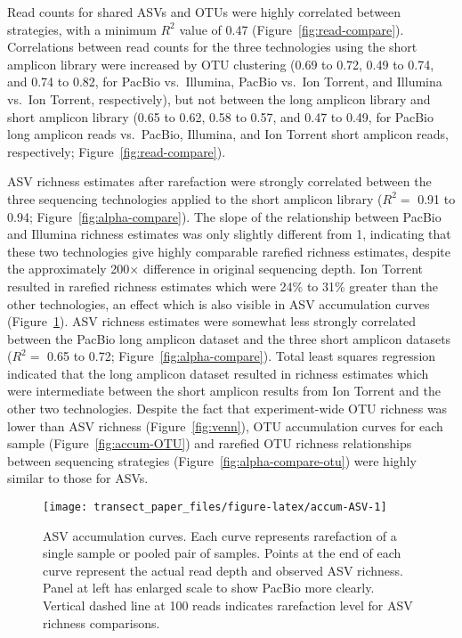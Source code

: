 \documentclass[
  12pt,
]{article}
\begin{document}
Read counts for shared ASVs and OTUs were highly correlated between strategies, with a minimum \(R^2\) value of 0.47 (Figure~\ref{fig:read-compare}).
Correlations between read counts for the three technologies using the short amplicon library were increased by OTU clustering
(0.69 to 0.72,
0.49 to 0.74, and
0.74 to 0.82,
for PacBio vs.~Illumina, PacBio vs.~Ion Torrent, and Illumina vs.~Ion Torrent, respectively), but not between the long amplicon library and short amplicon library
(0.65 to 0.62,
0.58 to 0.57, and
0.47 to 0.49, for PacBio long amplicon reads vs.~PacBio, Illumina, and Ion Torrent short amplicon reads, respectively; Figure~\ref{fig:read-compare}).

ASV richness estimates after rarefaction were strongly correlated between the three sequencing technologies applied to the short amplicon library (\(R^2 =\) 0.91 to 0.94; Figure~\ref{fig:alpha-compare}).
The slope of the relationship between PacBio and Illumina richness estimates was only slightly different from 1, indicating that these two technologies give highly comparable rarefied richness estimates, despite the approximately 200× difference in original sequencing depth.
Ion Torrent resulted in rarefied richness estimates which were 24\% to 31\% greater than the other technologies, an effect which is also visible in ASV accumulation curves (Figure~\ref{fig:accum-ASV}).
ASV richness estimates were somewhat less strongly correlated between the PacBio long amplicon dataset and the three short amplicon datasets (\(R^2 =\) 0.65 to 0.72; Figure~\ref{fig:alpha-compare}).
Total least squares regression indicated that the long amplicon dataset resulted in richness estimates which were intermediate between the short amplicon results from Ion Torrent and the other two technologies.
Despite the fact that experiment-wide OTU richness was lower than ASV richness (Figure~\ref{fig:venn}), OTU accumulation curves for each sample
(Figure~\ref{fig:accum-OTU}) and rarefied OTU richness relationships between sequencing strategies (Figure~\ref{fig:alpha-compare-otu}) were highly similar to those for ASVs.








\begin{figure}

{\centering \texttt{[image: transect\_paper\_files/figure-latex/accum-ASV-1]} 

}

\caption[ASV accumulation curves]{ASV accumulation curves. Each curve represents rarefaction of a single sample or pooled pair of samples.
Points at the end of each curve represent the actual read depth and observed ASV richness.
Panel at left has enlarged scale to show PacBio more clearly.
Vertical dashed line at 100 reads indicates rarefaction level for ASV richness comparisons.}\label{fig:accum-ASV}
\end{figure}
\end{document}
